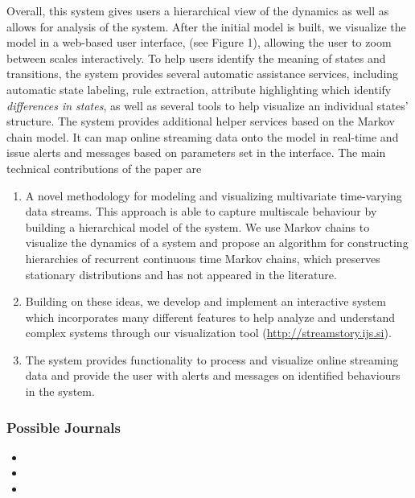 Overall, this system gives users a hierarchical view of the dynamics as well as 
allows for analysis of the system. After the initial model is built, we visualize the model
in a web-based user interface, (see Figure 1), allowing the 
user to zoom between scales interactively. To help users identify the
meaning of states and transitions, the system provides several automatic assistance services,
including automatic state labeling, rule extraction, attribute highlighting which
identify \emph{differences in states}, as well as several tools to help visualize an individual states'
structure. 
%
The system provides additional helper  services based on the Markov chain model. It can map online streaming data onto 
the model in real-time and issue alerts and messages based on parameters set in the interface. %
%
The main technical contributions of the paper are
\begin{enumerate}{}
  \item A novel methodology for modeling and visualizing multivariate time-varying data streams. This approach is able to capture multiscale behaviour by building a hierarchical model of the system. We use Markov chains to visualize the dynamics of a system and propose an algorithm for constructing hierarchies of recurrent continuous time Markov chains, which preserves stationary distributions and has not appeared in the literature. %
  \item Building on these ideas, we develop and implement an interactive system which incorporates many different features to help analyze and understand complex systems through our visualization tool (\url{http://streamstory.ijs.si}).
  \item The system provides functionality to process and visualize online streaming data and provide the user with  alerts and messages on identified behaviours in the system.  
\end{enumerate}


\subsubsection{Possible Journals}

\begin{itemize}
	\item {}
	\item {}
	\item {}
\end{itemize}